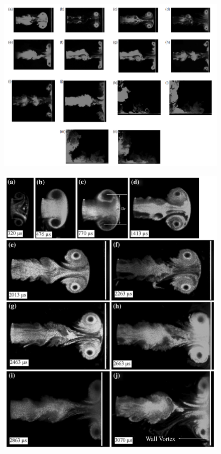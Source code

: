 \begin{figure}[H] 
	\centering
	\includegraphics[width=\textwidth]{thangadurai2010.PNG} 
	\caption{\cite{murugan2010}}
\end{figure}

\begin{figure}[H] 
	\centering
	\includegraphics[scale=0.9]{thangadurai2012.PNG} 
	\caption{\cite{murugan2012}}
\end{figure}

